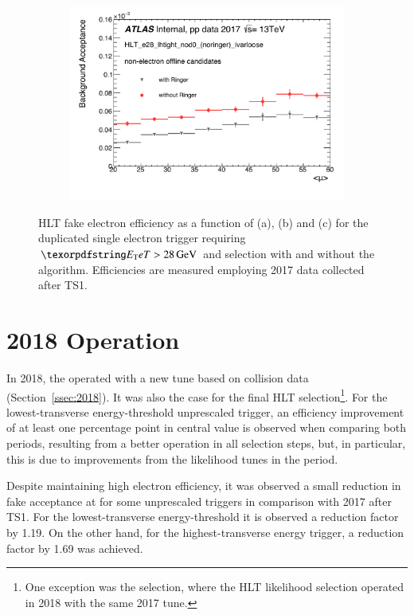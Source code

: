 \begin{figure}[h!tb]
\begin{center}
\begin{subfigure}[c]{.48\textwidth}
\centering
\includegraphics[width=\textwidth]{sections/operation/figures/efficiencies/eff_EGAM7_e28_ringer_and_noringer_2017_after_ts1_mu.pdf}
\caption{}
\end{subfigure}
\caption{HLT fake electron efficiency as a function of \et (a), \eta (b) and
\avgmu (c) for the duplicated single electron trigger requiring $\et >
\SI{28}{\GeV}$ and \tight selection with and without the \rnn{} algorithm.
Efficiencies are measured employing 2017 data collected after TS1.}%
\label{fig:e28_triggers_fake_hlt}
\end{center}
\end{figure}


\FloatBarrier

\section{2018 Operation}\label{ssec:2018_ringer_operation}

In 2018, the \rnn{} operated with a new tune based on collision data
(Section~\ref{ssec:2018}). It was also the case for the final HLT
selection\footnote{One exception was the \medium{} selection, where the HLT
likelihood selection operated in 2018 with the same 2017 tune.}. For the
lowest-transverse energy-threshold unprescaled trigger, an efficiency
improvement of at least one percentage point in central value is observed when
comparing both periods, resulting from a better operation in all selection
steps, but, in particular, this is due to improvements from the likelihood tunes in the period.

Despite maintaining high electron efficiency, it was observed a small reduction in fake acceptance at \fastcalo{} for some unprescaled triggers in comparison with 2017 after TS1. For the lowest-transverse energy-threshold it is observed a reduction factor by 1.19. On the other hand, for the highest-transverse energy trigger, a reduction factor by 1.69 was achieved.


